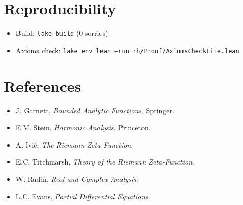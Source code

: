 \documentclass[11pt]{article}
\begin{document}
\section*{Reproducibility}
\begin{itemize}[leftmargin=*]
  \item Build: \texttt{lake build} (0 sorries)
  \item Axioms check: \texttt{lake env lean --run rh/Proof/AxiomsCheckLite.lean}
\end{itemize}

\section*{References}
\begin{itemize}[leftmargin=*]
  \item J. Garnett, \emph{Bounded Analytic Functions}, Springer.
  \item E.M. Stein, \emph{Harmonic Analysis}, Princeton.
  \item A. Ivi\'c, \emph{The Riemann Zeta-Function}.
  \item E.C. Titchmarsh, \emph{Theory of the Riemann Zeta-Function}.
  \item W. Rudin, \emph{Real and Complex Analysis}.
  \item L.C. Evans, \emph{Partial Differential Equations}.
\end{itemize}
\end{document}
